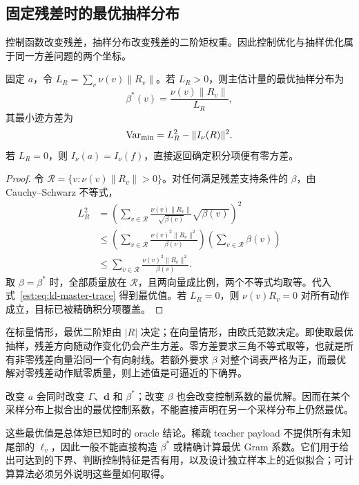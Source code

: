 \subsection{固定残差时的最优抽样分布}

控制函数改变残差，抽样分布改变残差的二阶矩权重。因此控制优化与抽样优化属于同一方差问题的两个坐标。

\begin{theorem}[残差范数决定迹方差最优抽样]
\label{est:thm:kl-master-proposal}
固定 $a$，令 $L_R=\sum_v\nu(v)\lVert R_v\rVert$。若 $L_R>0$，则主估计量的最优抽样分布为
\begin{equation*}
 \beta^*(v)=\frac{\nu(v)\lVert R_v\rVert}{L_R},
\end{equation*}
其最小迹方差为
\begin{equation*}
 \operatorname{Var}_{\min}=L_R^2-\lVert I_\nu(R)\rVert^2.
\end{equation*}
若 $L_R=0$，则 $I_\nu(a)=I_\nu(f)$，直接返回确定积分项便有零方差。
\end{theorem}

\begin{proof}
令 $\mathcal R=\{v:\nu(v)\lVert R_v\rVert>0\}$。对任何满足残差支持条件的 $\beta$，由 Cauchy--Schwarz 不等式，
\begin{align*}
 L_R^2
 &=\left(\sum_{v\in\mathcal R}\frac{\nu(v)\lVert R_v\rVert}{\sqrt{\beta(v)}}\sqrt{\beta(v)}\right)^2\\
 &\le\left(\sum_{v\in\mathcal R}\frac{\nu(v)^2\lVert R_v\rVert^2}{\beta(v)}\right)
       \left(\sum_{v\in\mathcal R}\beta(v)\right)\\
 &\le\sum_{v\in\mathcal R}\frac{\nu(v)^2\lVert R_v\rVert^2}{\beta(v)}.
\end{align*}
取 $\beta=\beta^*$ 时，全部质量放在 $\mathcal R$，且两向量成比例，两个不等式均取等。代入式~\eqref{est:eq:kl-master-trace} 得到最优值。若 $L_R=0$，则 $\nu(v)R_v=0$ 对所有动作成立，目标已被精确积分项覆盖。
\end{proof}

在标量情形，最优二阶矩由 $\lvert R\rvert$ 决定；在向量情形，由欧氏范数决定。即使取最优抽样，残差方向随动作变化仍会产生方差。零方差要求三角不等式取等，也就是所有非零残差向量沿同一个有向射线。若额外要求 $\beta$ 对整个词表严格为正，而最优解对零残差动作赋零质量，则上述值是可逼近的下确界。

改变 $a$ 会同时改变 $\Gamma$、$\mathbf d$ 和 $\beta^*$；改变 $\beta$ 也会改变控制系数的最优解。因而在某个采样分布上拟合出的最优控制系数，不能直接声明在另一个采样分布上仍然最优。

这些最优值是总体矩已知时的 oracle 结论。稀疏 teacher payload 不提供所有未知尾部的 $\ell_v$，因此一般不能直接构造 $\beta^*$ 或精确计算最优 Gram 系数。它们用于给出可达到的下界、判断控制特征是否有用，以及设计独立样本上的近似拟合；可计算算法必须另外说明这些量如何取得。

